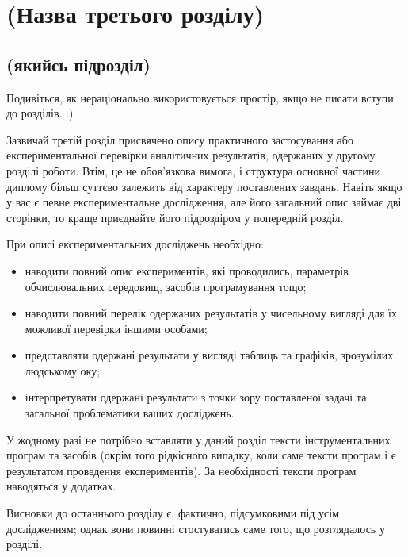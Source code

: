 \chapter{(Назва третього розділу)}
\label{chap:practice}

\section{(якийсь підрозділ)}

Подивіться, як нераціонально використовується простір, якщо не писати
вступи до розділів. :)

Зазвичай третій розділ присвячено опису практичного застосування або
експериментальної перевірки аналітичних результатів, одержаних у другому
розділі роботи. Втім, це не обов'язкова вимога, і структура основної
частини диплому більш суттєво залежить від характеру поставлених завдань.
Навіть якщо у вас є певне експериментальне дослідження, але його загальний
опис займає дві сторінки, то краще приєднайте його підроздіром у
попередній розділ.

При описі експериментальних досліджень необхідно:

\begin{itemize}
\item наводити повний опис експериментів, які проводились, параметрів
обчислювальних середовищ, засобів програмування тощо;
\item наводити повний перелік одержаних результатів у чисельному вигляді для їх можливої
перевірки іншими особами;
\item представляти одержані результати у вигляді таблиць та графіків,
зрозумілих людському оку;
\item інтерпретувати одержані результати з точки зору поставленої задачі
та загальної проблематики ваших досліджень.
\end{itemize}

У жодному разі не потрібно вставляти у даний розділ тексти
інструментальних програм та засобів (окрім того рідкісного випадку, коли
саме тексти програм і є результатом проведення експериментів). За
необхідності тексти програм наводяться у додатках.


\chapconclude{\ref{chap:practice}}

Висновки до останнього розділу є, фактично, підсумковими під усім
дослідженням; однак вони повинні стостуватись саме того, що розглядалось у
розділі.
